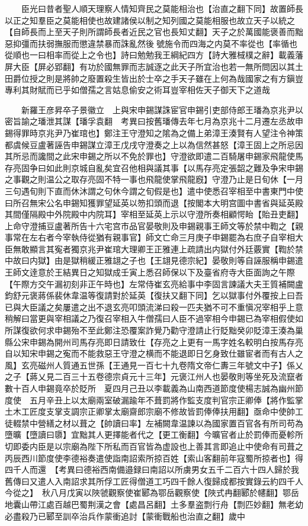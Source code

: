 　　臣光曰昔者聖人順天理察人情知齊民之莫能相治也【治直之翻下同】故置師長以正之知羣臣之莫能相使也故建諸侯以制之知列國之莫能相服也故立天子以統之【自師長而上至天子則所謂師長者近民之官也長知丈翻】天子之於萬國能褒善而黜惡抑彊而扶弱撫服而懲違禁暴而誅亂然後號施令而四海之内莫不率從也【率循也從順也一曰相率而從上之令也】詩曰勉勉我王綱紀四方【詩大雅棫樸之辭】載義藩屏大臣【屏必郢翻】有功於國無罪而志誠逐之此天子所宜治也若一無所問因以其土田爵位授之則是將帥之廢置殺生皆出於士卒之手天子雖在上何為哉國家之有方鎭豈專利其財賦而已乎如僧孺之言姑息偷安之術耳豈宰相佐天子御天下之道哉

　　新羅王彦昇卒子景徽立　上與宋申錫謀誅宦官申錫引吏部侍郎王璠為京兆尹以密旨諭之璠泄其謀【璠孚袁翻　考異曰按舊璠傳去年七月為京兆十二月遷左丞故申錫得罪時京兆尹乃崔琯也】鄭注王守澄知之隂為之備上弟漳王湊賢有人望注令神策都虞候豆盧著誣告申錫謀立漳王戊戌守澄奏之上以為信然甚怒【漳王固上之所忌因其所忌而讒間之此宋申錫之所以不免於罪也】守澄欲即遣二百騎屠申錫家飛龍使馬存亮固争曰如此則京城自亂矣宜召他相與議其事【以馬存亮定張韶之難及争宋申錫之事觀之則温公之取存亮固不特一事也飛龍使掌飛龍廐】守澄乃止是日旬休【一月三句遇旬則下直而休沐謂之句休今謂之旬假是也】遣中使悉召宰相至中書東門中使曰所召無宋公名申錫知獲罪望延英以笏扣頭而退【按閣本大明宫圖中書省與延英殿其間僅隔殿中外院殿中内院耳】宰相至延英上示以守澄所奏相顧愕眙【貽丑吏翻】上命守澄捕豆盧著所告十六宅宫市品官晏敬則及申錫親事王師文等於禁中鞫之【親事常在左右者今宰執侍從猶有親事官】師文亡命三月庚子申錫罷為右庶子自宰相大臣無敢顯言其寃者獨京兆尹崔琯大理卿王正雅連上疏請出内獄付外廷覈實【鞫於禁中故曰内獄】由是獄稍緩正雅翃之子也【王翃見德宗紀】晏敬則等自誣服稱申錫遣王師文逹意於王結異日之知獄成壬寅上悉召師保以下及臺省府寺大臣面詢之午際【午際方交午漏初刻非正午時也】左常侍崔玄亮給事中李固言諫議大夫王質補闕盧鈞舒元褒蔣係裴休韋温等復請對於延英【復扶又翻下同】乞以獄事付外覆按上曰吾已與大臣議之矣屢遣之出不退玄亮叩頭流涕曰殺一匹夫猶不可不重愼况宰相乎上意稍解曰當更與宰相議之乃復召宰相入牛僧孺曰人臣不過宰相今申錫已為宰相假使如所謀復欲何求申錫殆不至此鄭注恐覆案詐覺乃勸守澄請止行貶黜癸卯貶漳王湊為巢縣公宋申錫為開州司馬存亮即日請致仕【存亮之上更有一馬字姓名較明白按馬存亮自以知宋申錫之寃而不能救惡王守澄之横而不能退即日乞身致仕雖宦者而有古人之風】玄亮磁州人質通五世孫【王通見一百七十九卷隋文帝仁夀三年號文中子】係乂之子【蔣乂見二百三十五卷德宗貞元十三年】元褒江州人也晏敬則等坐死及流竄者數十百人申錫竟卒於貶所　夏四月己丑以李載義為山南西道節度使楊志誠為幽州節度使　五月辛丑上以太廟兩室破漏踰年不葺罰將作監支度判官宗正卿俸【將作監掌土木工匠度支掌支調宗正卿掌太廟齋郎宗廟不修故皆罰俸俸扶用翻】亟命中使帥工徒輟禁中營繕之材以葺之【帥讀曰率】左補闕韋温諫以為國家置百官各有所司苟為墮曠【墮讀曰隳】宜黜其人更擇能者代之【更工衡翻】今曠官者止於罰俸而憂軫所切即委内臣是以宗廟為陛下所私而百官皆為虚設也上善其言即追止中使命有司葺之　丙辰西川節度使李德裕奏遣使詣南詔索所掠百姓【索山客翻前年寇蜀所掠者也】得四千人而還　【考異曰德裕西南備邉録曰南詔以所虜男女五千二百六十四人歸於我舊傳曰又遣人入南詔求其所俘工匠得僧道工巧四千餘人復歸成都按實錄云約四千人今從之】　秋八月戊寅以陜虢觀察使崔郾為鄂岳觀察使【陜式冉翻郾於幰翻】鄂岳地囊山帶江處百越巴蜀荆漢之會【處昌呂翻】土多羣盗剽行舟【剽匹妙翻】無老幼必盡殺乃已郾至訓卒治兵作蒙衝追討【蒙衝戰船也治直之翻】歲中